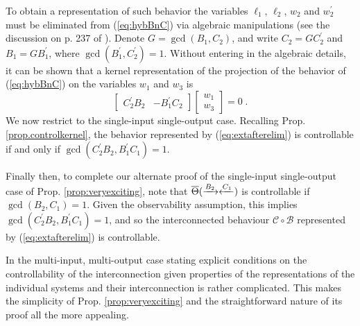 To obtain a representation of such behavior the variables $\ell_1$, $\ell_2$,
$w_2$ and $w_2^\prime$ must be eliminated from (\ref{eq:hybBnC}) via algebraic
manipulations (see the discussion on p. 237 of \cite{Wi2}). Denote
$G=\gcd(B_1,C_2)$, and write $C_2=G C_2^\prime$ and $B_1=G B_1^\prime$, where
$\gcd(B_1^\prime, C_2^\prime)=1$.  Without entering in the algebraic details, it
can be shown that a kernel representation of the projection of the behavior of
(\ref{eq:hybBnC}) on the variables $w_1$ and $w_3$ is
\begin{equation}\label{eq:extafterelim}
  \begin{bmatrix} C_2^\prime B_2& -B_1^\prime C_2\end{bmatrix} 
  \begin{bmatrix} w_1\\ w_3\end{bmatrix}=0\; .
\end{equation}
We now restrict to the single-input single-output case. Recalling Prop.
\ref{prop.controlkernel}, the behavior represented by (\ref{eq:extafterelim}) is
controllable if and only if $\gcd(C_2^\prime B_2, B_1^\prime C_1)=1$. 

Finally then, to complete our alternate proof of the single-input single-output
case of Prop. \ref{prop:veryexciting}, note that
$\overline{\Theta}(\xrightarrow{B_2}\xleftarrow{C_1})$ is controllable if
$\gcd(B_2, C_1)=1$.  Given the observability assumption, this implies
$\gcd(C_2^\prime B_2, B_1^\prime C_1)=1$, and so the interconnected behaviour
$\mathscr{C} \circ \mathscr{B}$ represented by (\ref{eq:extafterelim}) is
controllable. 

In the multi-input, multi-output case stating explicit conditions on the
controllability of the interconnection given properties of the
representations of the individual systems and their interconnection is rather
complicated. This makes the simplicity of Prop. \ref{prop:veryexciting} and the
straightforward nature of its proof all the more appealing.



